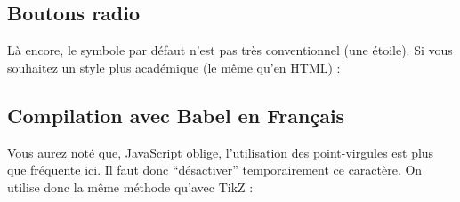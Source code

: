 \documentclass[12pt,oneside]{report}
\begin{document}
\begin{spacing}{1.2}
\subsection*{Boutons radio}

Là encore, le symbole par défaut n’est pas très conventionnel (une étoile). Si vous souhaitez un style plus académique (le même qu’en HTML) :

\begin{Cadre}
\begin{Form}
\end{Form}
\medskip
\end{Cadre}


\subsection*{Compilation avec Babel en Français}

Vous aurez noté que, JavaScript oblige, l’utilisation des point-virgules est plus que fréquente ici. Il faut donc “désactiver” temporairement ce caractère. On utilise donc la même méthode qu’avec TikZ :

\begin{Cadre}
\begin{Form}
\shorthandoff{;}
\begin{Form}
\end{Form}
\shorthandon{;}
\end{Form}
\medskip
\end{Cadre}

  

\end{spacing}
\end{document}
